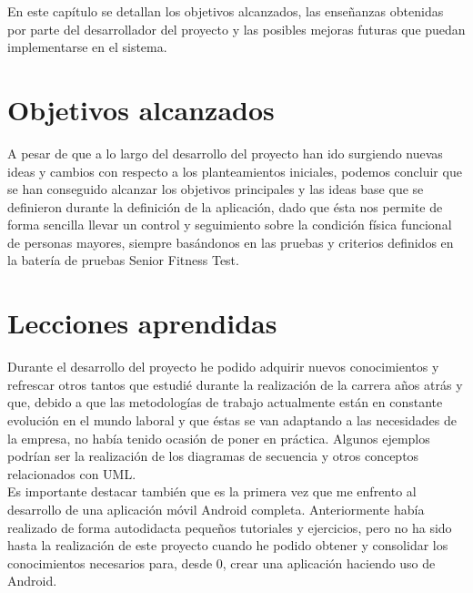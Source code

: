 

En este capítulo se detallan los objetivos alcanzados, las enseñanzas obtenidas por parte del desarrollador del proyecto y las posibles mejoras futuras que puedan implementarse en el sistema.

\section{Objetivos alcanzados}

A pesar de que a lo largo del desarrollo del proyecto han ido surgiendo nuevas ideas y cambios con respecto a los planteamientos iniciales, podemos concluir que se han conseguido alcanzar los objetivos principales y las ideas base que se definieron durante la definición de la aplicación, dado que ésta nos permite de forma sencilla llevar un control y seguimiento sobre la condición física funcional de personas mayores, siempre basándonos en las pruebas y criterios definidos en la batería de pruebas Senior Fitness Test.\\

\section{Lecciones aprendidas}

Durante el desarrollo del proyecto he podido adquirir nuevos conocimientos y refrescar otros tantos que estudié durante la realización de la carrera años atrás y que, debido a que las metodologías de trabajo actualmente están en constante evolución en el mundo laboral y que éstas se van adaptando a las necesidades de la empresa, no había tenido ocasión de poner en práctica. Algunos ejemplos podrían ser la realización de los diagramas de secuencia y otros conceptos relacionados con UML.\\

Es importante destacar también que es la primera vez que me enfrento al desarrollo de una aplicación móvil Android completa. Anteriormente había realizado de forma autodidacta pequeños tutoriales y ejercicios, pero no ha sido hasta la realización de este proyecto cuando he podido obtener y consolidar los conocimientos necesarios para, desde 0, crear una aplicación haciendo uso de Android.\\

